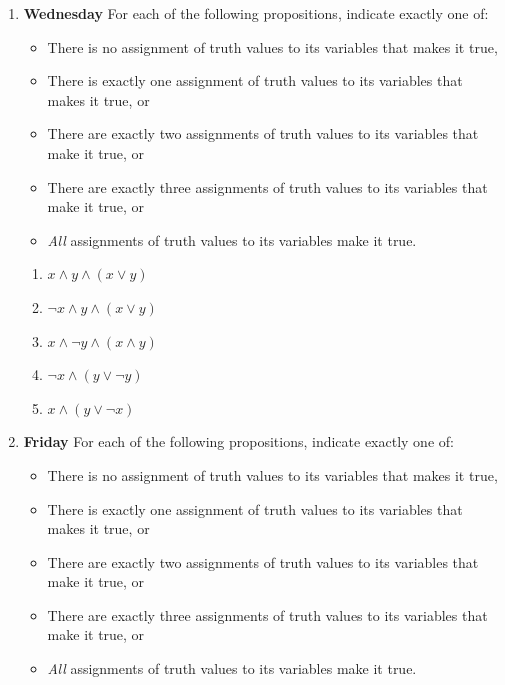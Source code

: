 \documentclass[12pt, oneside]{article}
\begin{document}
\begin{enumerate}
\begin{enumerate}
\end{enumerate}

\item {\bf Wednesday} For each of the following propositions, indicate exactly one of:

\begin{itemize}
    \item There is no assignment of truth values to its variables that makes it true,
    \item There is exactly one assignment of truth values to its variables that makes it true, or
    \item There are exactly two assignments of truth values to its variables that make it true, or
    \item There are exactly three assignments of truth values to its variables that make it true, or
    \item \emph{All} assignments of truth values to its variables make it true.
\end{itemize}

\begin{enumerate}
    \item $x \land y \land (x \lor y)$
    \item $\lnot x \land y \land (x \lor y)$
    \item $x \land \lnot y \land (x \land y)$
    \item $\lnot x \land (y \lor \lnot y)$
    \item $x \land (y \lor \lnot x)$
\end{enumerate}

\newpage
\item {\bf Friday} For each of the following propositions, indicate exactly one of:

\begin{itemize}
    \item There is no assignment of truth values to its variables that makes it true,
    \item There is exactly one assignment of truth values to its variables that makes it true, or
    \item There are exactly two assignments of truth values to its variables that make it true, or
    \item There are exactly three assignments of truth values to its variables that make it true, or
    \item \emph{All} assignments of truth values to its variables make it true.
\end{itemize}


\end{enumerate}
\end{document}
